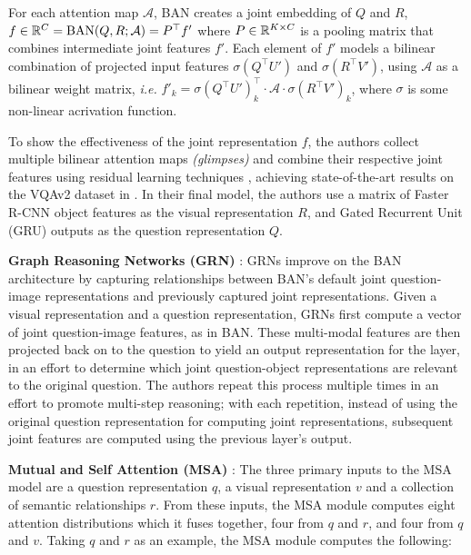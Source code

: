 For each attention map \(\mathcal{A}\), BAN creates a joint embedding of \(Q\) and \(R\), \(f \in \mathbb{R}^C = \text{BAN}(Q, R; \mathcal{A}) = P^\top f'\) where \(P \in \mathbb{R}^{K \times C}\) is a pooling matrix that combines intermediate joint features \(f'\). Each element of \(f'\) models a bilinear combination of projected input features \(\sigma (Q^\top U')\) and \(\sigma (R^\top V')\), using \(\mathcal{A}\) as a bilinear weight matrix, \textit{i.e.} \(f'_k = \sigma (Q^\top U')^\top_k \cdot \mathcal{A} \cdot \sigma (R^\top V')_k\), where \(\sigma\) is some non-linear acrivation function.

To show the effectiveness of the joint representation \(f\), the authors collect multiple bilinear attention maps \textit{(glimpses)} and combine their respective joint features using residual learning techniques \cite{kim2016multimodal}, achieving state-of-the-art results on the VQAv2 dataset in \citeyear{kim2018bilinear}. In their final model, the authors use a matrix of Faster R-CNN object features as the visual representation \(R\), and Gated Recurrent Unit (GRU) \cite{cho2014learning} outputs as the question representation \(Q\).

\textbf{Graph Reasoning Networks (GRN)} \cite{guo2019bilinear}: GRNs improve on the BAN architecture by capturing relationships between BAN's default joint question-image representations and previously captured joint representations. Given a visual representation and a question representation, GRNs first compute a vector of joint question-image features, as in BAN. These multi-modal features are then projected back on to the question to yield an output representation for the layer, in an effort to determine which joint question-object representations are relevant to the original question. The authors repeat this process multiple times in an effort to promote multi-step reasoning; with each repetition, instead of using the original question representation for computing joint representations, subsequent joint features are computed using the previous layer's output.


\textbf{Mutual and Self Attention (MSA)} \cite{farazi2020attention}: The three primary inputs to the MSA model are a question representation \(q\), a visual representation \(v\) and a collection of semantic relationships \(r\). From these inputs, the MSA module computes eight attention distributions which it fuses together, four from \(q\) and \(r\), and four from \(q\) and \(v\). Taking \(q\) and \(r\) as an example, the MSA module computes the following:

